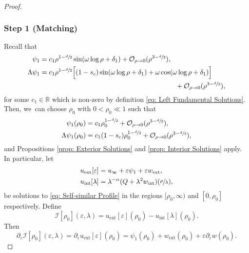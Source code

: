 \documentclass[JEP,XML,SOM,Unicode]{cedram}
\theoremstyle{plain}
\theoremstyle{definition}
\DeclareMathOperator{\exterior}{ext}
\DeclareMathOperator{\interior}{int}
\begin{document}
\skpt
\begin{proof}\vspace*{-5pt}
\subsubsection*{Step 1 (Matching)}
Recall that\vspace*{-3pt}
\begin{equation}
\label{eq: Asymptote of psi_1}
\begin{aligned}
\psi_1&= c_1\rho^{1-\sfrac{d}{2}}\sin(\omega\log\rho+\delta_1)+\mathcal O_{\rho\to 0}(\rho^{3-\sfrac{d}{2}}),\\
\Lambda \psi_1&=c_1 \rho^{1-\sfrac{d}{2}}\Big[(1-s_c)\sin(\omega\log\rho+\delta_1)+\omega\cos(\omega\log\rho+\delta_1)\Big]\\
&\hspace*{7cm}+\mathcal O_{\rho\to 0}(\rho^{3-\sfrac{d}{2}}),
\end{aligned}
\end{equation}
for some $c_1\in\mathbb R$ which is non-zero by definition \eqref{eq: Left Fundamental Solutions}. Then, we~can choose $\rho_0$ with $0<\rho_0\ll 1$ such that\vspace*{-3pt}
\begin{equation}
\label{intiialirnot}
\begin{aligned}
\psi_1(\rho_0)&=c_1\rho_0^{1-\sfrac{d}{2}}+\mathcal O_{\rho\to 0}(\rho^{3-\sfrac{d}{2}}),\\
\Lambda\psi_1(\rho_0)&=c_1(1-s_c)\rho_0^{1-\sfrac{d}{2}}+\mathcal O_{\rho\to 0}(\rho^{3-\sfrac{d}{2}}),
\end{aligned}
\end{equation}
and Propositions \ref{prop: Exterior Solutions} and \ref{prop: Interior Solutions} apply. In particular, let
\[
\begin{aligned}
u_{\exterior}[\varepsilon] &=u_\infty +\varepsilon \psi_1+\varepsilon w_{\exterior},\\
u_{\interior}[\lambda] &=\lambda^{-\alpha}(Q+\lambda^2 w_{\interior})(\sfrac{\rho}{\lambda}),
\end{aligned}
\]
be solutions to \eqref{eq: Self-similar Profile} in the regions $[\rho_0,\infty)$ and $[0,\rho_0]$ respectively. Define
\[
\mathcal I[\rho_0](\varepsilon,\lambda)=u_{\exterior}[\varepsilon](\rho_0)-u_{\interior}[\lambda](\rho_0).
\]
Then
\[
\partial_\varepsilon \mathcal I[\rho_0](\varepsilon,\lambda)=\partial_\varepsilon u_{\exterior}[\varepsilon](\rho_0)=\psi_1(\rho_0)+w_{\exterior}(\rho_0)+\varepsilon\partial_\varepsilon w(\rho_0).
\]
\end{proof}
\end{document}
